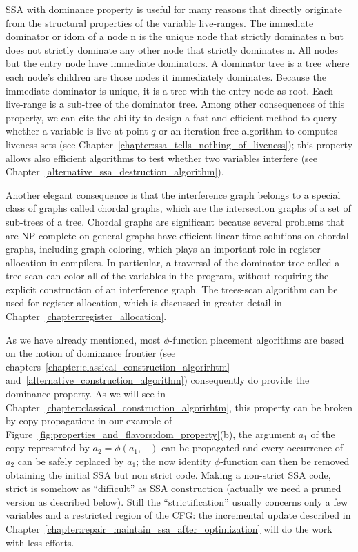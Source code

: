 SSA with dominance property is useful for many reasons that directly originate from the structural properties of the variable live-ranges. 
The immediate dominator or idom of a node n is the unique node that strictly dominates n but does not strictly dominate any other node that strictly dominates n. All nodes but the entry node have immediate dominators. A dominator tree is a tree where each node's children are those nodes it immediately dominates. Because the immediate dominator is unique, it is a tree with the entry node as root. Each live-range is a sub-tree of the dominator tree. 
Among other consequences of this property, we can cite the ability to design a fast and efficient method to query whether a variable is live at point $q$ or an iteration free algorithm to computes liveness sets (see Chapter~\ref{chapter:ssa_tells_nothing_of_liveness}); this property allows also efficient algorithms to test whether two variables interfere (see Chapter~\ref{alternative_ssa_destruction_algorithm}). 

Another elegant consequence is that the interference graph belongs to a special class of
graphs called chordal graphs, which are the intersection graphs of a set
of sub-trees of a tree. Chordal graphs are significant because several
problems that are NP-complete on general graphs have efficient linear-time
solutions on chordal graphs, including graph coloring, which plays
an important role in register allocation in compilers. In particular,
a traversal of the dominator tree called a tree-scan can color all of
the variables in the program, without requiring the explicit construction
of an interference graph. The trees-scan algorithm can be used
for register allocation, which is discussed
in greater detail in Chapter~\ref{chapter:register_allocation}. 

As we have already mentioned, most $\phi$-function placement algorithms are based on the notion of dominance frontier (see chapters~\ref{chapter:classical_construction_algorirhtm} and~\ref{alternative_construction_algorithm}) consequently do provide the dominance property. As we will see in Chapter~\ref{chapter:classical_construction_algorirhtm}, this property can be broken by copy-propagation: in our example of Figure~\ref{fig:properties_and_flavors:dom_property}(b), the argument $a_1$ of the copy represented by $a_2=\phi(a_1,\bot)$ can be propagated and every occurrence of $a_2$ can be safely replaced by $a_1$; the now identity $\phi$-function can then be removed obtaining the initial SSA but non strict code. Making a non-strict SSA code, strict is somehow as ``difficult'' as SSA construction (actually we need a pruned version as described below). Still the ``strictification'' usually concerns only a few variables and a restricted region of the CFG: the incremental update described in Chapter~\ref{chapter:repair_maintain_ssa_after_optimization} will do the work with less efforts.

